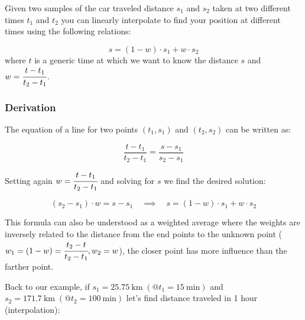 Given two samples of the car traveled distance \(s_1\) and \(s_2\) taken at two different times \(t_1\) and \(t_2\) you can linearly interpolate to find your position at different times using the following relations:

\begin{equation}
s = (1 - w)\cdot s_1 + w \cdot s_2
\end{equation}
where $t$ is a generic time at which we want to know the distance $s$ and \(w = \cfrac{t - t_1}{t_2 - t_1}\).

\begin{attention}
\subsubsection{Derivation}
The equation of a line for two points
\((t_1, s_1)\) and \((t_2, s_2)\) can be written as:

\begin{equation}
\frac{t - t_1}{t_2 - t_1} = \frac{s - s_1}{s_2 - s_1}
\end{equation}

Setting again \(w = \cfrac{t - t_1}{t_2 - t_1}\) and solving for \(s\) we find the desired solution:

\begin{equation}(s_2 - s_1)\cdot w = s - s_1\quad\implies\quad s = (1 - w)\cdot s_1 + w \cdot s_2
\end{equation}

This formula can also be understood as a weighted average where the weights are inversely related to the distance from the end points to the unknown point ($w_1 = (1 - w) = \cfrac{t_2 - t}{t_2 -t_1}, w_2 = w$), the closer point has more influence than the farther point.
\end{attention}

Back to our example, if
\(s_1 = 25.75~\mathrm{km}\;(@t_1 = 15~\mathrm{min})\) and
\(s_2 = 171.7~\mathrm{km}\;(@t_2 = 100~\mathrm{min})\) let's find distance traveled in 1 hour (interpolation):


